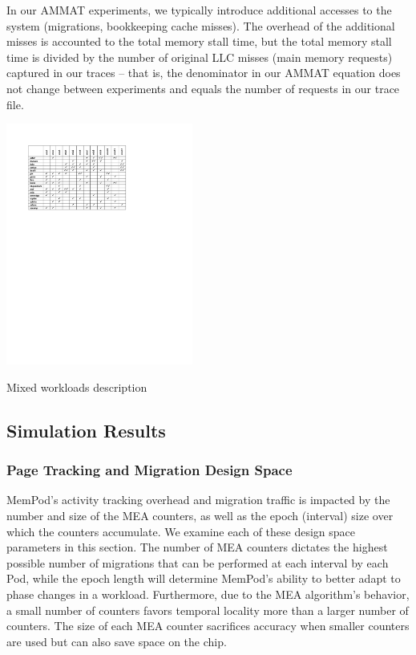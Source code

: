 In our AMMAT experiments, we typically introduce additional accesses to the
system (migrations, bookkeeping cache misses).  The overhead of the additional
misses is accounted to the total memory stall time, but the total memory 
stall time is divided by the number of original LLC misses (main memory requests) captured in our traces
-- that is, the denominator in our AMMAT equation does not change between
experiments and equals the number of requests in our trace file.

\begin{table}
  \includegraphics[width=0.46\textwidth]{figures/workloads_checkmarks.pdf}
  \caption{Mixed workloads description}
  \label{tab:workloads}
\end{table}

\subsection{Simulation Results}
\label{sub:SimResults}

\subsubsection{Page Tracking and Migration Design Space}

MemPod's activity tracking overhead and migration traffic is impacted by
the number and size of the MEA counters, as well as the epoch (interval) 
size over
which the counters accumulate.  We examine each of these design space
parameters in this section.
The number of MEA counters dictates the highest possible number of 
migrations that can be performed at each interval by each Pod, while the epoch length will determine MemPod's ability to better adapt to phase changes in a workload. Furthermore, due to the MEA algorithm's behavior, a small number of counters favors temporal locality more than a larger number of counters. The size of each MEA counter sacrifices accuracy when smaller counters are used 
but can also save space on the chip.  

